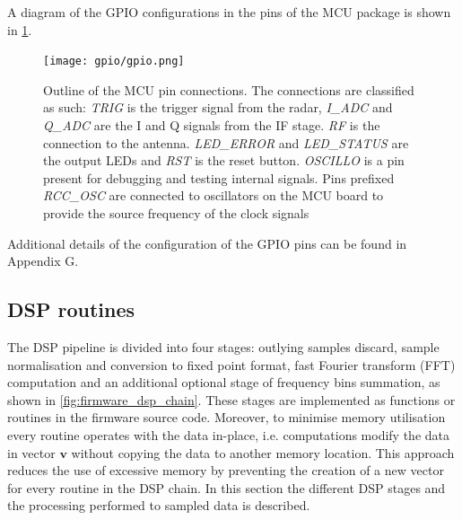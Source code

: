 A diagram of the GPIO configurations in the pins of the MCU package is shown in \cref{fig:firmware_gpio}.




\begin{figure}[ht]
	\centering
	\texttt{[image: gpio/gpio.png]}
	\caption{Outline of the MCU pin connections. The connections are classified as such: \textit{TRIG} is the trigger signal from the radar, \textit{I\_ADC} and \textit{Q\_ADC} are the I and Q signals from the IF stage. \textit{RF} is the connection to the antenna. \textit{LED\_ERROR} and \textit{LED\_STATUS} are the output LEDs and \textit{RST} is the reset button. \textit{OSCILLO} is a pin present for debugging and testing internal signals. Pins prefixed \textit{RCC\_OSC} are connected to oscillators on the MCU board to provide the source frequency of the clock signals}
	\label{fig:firmware_gpio}
\end{figure}

Additional details of the configuration of the GPIO pins can be found in Appendix G. %

\subsection{DSP routines} \label{sec:dsp_routines}

The DSP pipeline is divided into four stages: outlying samples discard, sample normalisation and conversion to fixed point format, fast Fourier transform (FFT) computation and an additional optional stage of frequency bins summation, as shown in \cref{fig:firmware_dsp_chain}. These stages are implemented as functions or routines in the firmware source code. Moreover, to minimise memory utilisation every routine operates with the data in-place, i.e. computations modify the data in vector $\mathbf{v}$ without copying the data to another memory location. This approach reduces the use of excessive memory by preventing the creation of a new vector for every routine in the DSP chain. In this section the different DSP stages and the processing performed to sampled data is described.

